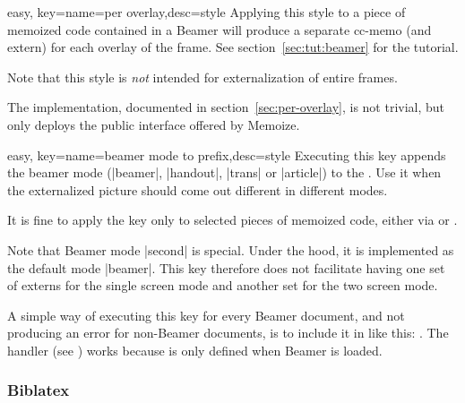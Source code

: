 \documentclass[a4paper,11pt]{article}
\begin{document}
\begin{doc}{easy, key={name=per overlay,desc=style}}
  Applying this style to a piece of memoized code contained in a Beamer
   will produce a separate cc-memo (and extern) for each overlay
  of the frame.  See section~\ref{sec:tut:beamer} for the tutorial.

  Note that this style is \emph{not} intended for externalization of entire
  frames.

  The implementation, documented in section~\ref{sec:per-overlay}, is not
  trivial, but only deploys the public interface offered by Memoize.
\end{doc}

\begin{doc}{easy, key={name=beamer mode to prefix,desc=style}}
  Executing this key appends the beamer mode (|beamer|, |handout|, |trans| or
  |article|) to the .  Use it when the externalized picture
  should come out different in different modes.

  It is fine to apply the key only to selected pieces of memoized code, either
  via  or .

  Note that Beamer mode |second| is special.  Under the hood, it is implemented
  as the default mode |beamer|.  This key therefore does not facilitate having
  one set of externs for the single screen mode and another set for the two
  screen mode.

  A simple way of executing this key for every Beamer document, and not
  producing an error for non-Beamer documents, is to include it in
   like this: .  The
   handler (see ) works because  is only defined when Beamer is loaded.
\end{doc}

\subsubsection{Biblatex}
\end{document}
